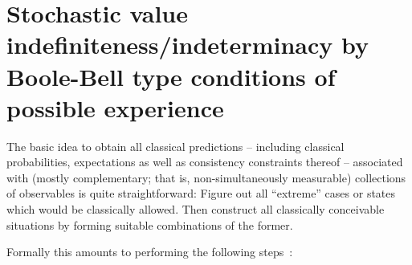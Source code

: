 \documentclass[%
  twocolumn,
 showpacs,
 showkeys,
 preprintnumbers,
 amsmath,amssymb,
 aps,
  pra,
  longbibliography,
 ]{revtex4-1}
\begin{document}
\section{Stochastic value indefiniteness/indeterminacy by Boole-Bell type conditions of possible experience}



The basic idea to obtain all classical predictions -- including classical probabilities, expectations as well as consistency constraints thereof  --
associated with (mostly complementary; that is, non-simultaneously measurable) collections of observables
is quite straightforward:
Figure out all ``extreme'' cases or states which would be classically allowed.
Then construct all classically conceivable situations by forming suitable combinations of the former.

Formally this amounts to performing the following steps~\citep{pitowsky-86,pitowsky,pitowsky-89a,Pit-91,Pit-94}:
\end{document}
